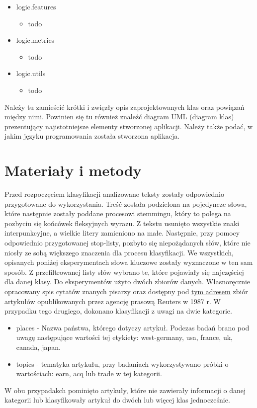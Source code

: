 \documentclass{classrep}
\begin{document}
\begin{itemize}
\begin{itemize}
	\end{itemize}
	\item logic.features
	\begin{itemize}
		\item todo
	\end{itemize}
	\item logic.metrics
	\begin{itemize}
		\item todo
	\end{itemize}
	\item logic.utils
	\begin{itemize}
		\item todo
	\end{itemize}
\end{itemize}

{\color{blue}
Należy tu zamieścić krótki i zwięzły opis zaprojektowanych klas oraz powiązań
między nimi. Powinien się tu również znaleźć diagram UML  (diagram klas)
prezentujący najistotniejsze elementy stworzonej aplikacji. Należy także
podać, w jakim języku programowania została stworzona aplikacja. }

\section{Materiały i metody}
Przed rozpoczęciem klasyfikacji analizowane teksty zostały odpowiednio przygotowane do wykorzystania. Treść została podzielona na pojedyncze słowa, które następnie zostały poddane procesowi stemmingu, który to polega na pozbyciu się końcówek fleksyjnych wyrazu. Z tekstu usunięto wszystkie znaki interpunkcyjne, a wielkie litery zamieniono na małe. Następnie, przy pomocy odpowiednio przygotowanej stop-listy, pozbyto się niepożądanych słów, które nie niosły ze sobą większego znaczenia dla procesu klasyfikacji.
We wszystkich, opisanych poniżej eksperymentach słowa kluczowe zostały wyznaczone w ten sam sposób. Z przefiltrowanej listy słów wybrano te, które pojawiały się najczęściej dla danej klasy. 
Do eksperymentów użyto dwóch zbiorów danych. Własnoręcznie opracowany spis cytatów znanych pisarzy oraz dostępny pod \href{http://archive.ics.uci.edu/ml/datasets/Reuters-21578+Text+Categorization+Collection}{tym adresem} zbiór artykułów opublikowanych przez agencję prasową Reuters w 1987 r. W przypadku tego drugiego, dokonano klasyfikacji z uwagi na dwie kategorie.
\begin{itemize}
	\item places - Nazwa państwa, którego dotyczy artykuł. Podczas badań brano pod uwagę następujące wartości tej etykiety: west-germany, usa, france, uk, canada, japan.
	\item topics - tematyka artykułu, przy badaniach wykorzystywano próbki o wartościach: earn, acq lub trade w tej kategorii.
\end{itemize}
W obu przypadakch pominięto artykuły, które nie zawierały informacji o danej kategorii lub klasyfikowały artykuł do dwóch lub więcej klas jednocześnie.
\end{document}
